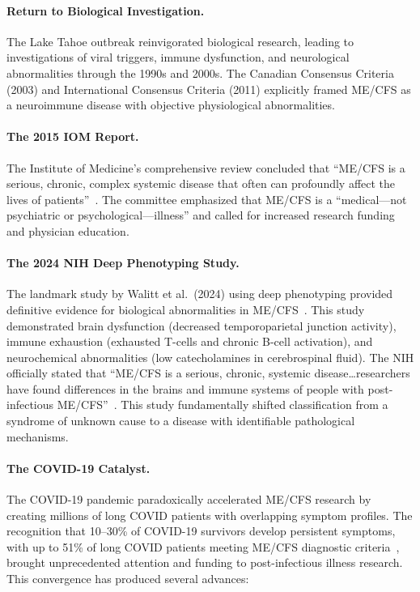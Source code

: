 \paragraph{Return to Biological Investigation.}
The Lake Tahoe outbreak reinvigorated biological research, leading to investigations of viral triggers, immune dysfunction, and neurological abnormalities through the 1990s and 2000s. The Canadian Consensus Criteria (2003) and International Consensus Criteria (2011) explicitly framed ME/CFS as a neuroimmune disease with objective physiological abnormalities.

\paragraph{The 2015 IOM Report.}
The Institute of Medicine's comprehensive review concluded that ``ME/CFS is a serious, chronic, complex systemic disease that often can profoundly affect the lives of patients''~\cite{IOM2015}. The committee emphasized that ME/CFS is a ``medical---not psychiatric or psychological---illness'' and called for increased research funding and physician education.

\paragraph{The 2024 NIH Deep Phenotyping Study.}
The landmark study by Walitt et al.\ (2024) using deep phenotyping provided definitive evidence for biological abnormalities in ME/CFS~\cite{walitt2024deep}. This study demonstrated brain dysfunction (decreased temporoparietal junction activity), immune exhaustion (exhausted T-cells and chronic B-cell activation), and neurochemical abnormalities (low catecholamines in cerebrospinal fluid). The NIH officially stated that ``ME/CFS is a serious, chronic, systemic disease\ldots researchers have found differences in the brains and immune systems of people with post-infectious ME/CFS''~\cite{nih2024mecfs}. This study fundamentally shifted classification from a syndrome of unknown cause to a disease with identifiable pathological mechanisms.

\paragraph{The COVID-19 Catalyst.}
The COVID-19 pandemic paradoxically accelerated ME/CFS research by creating millions of long COVID patients with overlapping symptom profiles. The recognition that 10--30\% of COVID-19 survivors develop persistent symptoms, with up to 51\% of long COVID patients meeting ME/CFS diagnostic criteria~\cite{RECOVER2025}, brought unprecedented attention and funding to post-infectious illness research. This convergence has produced several advances:

